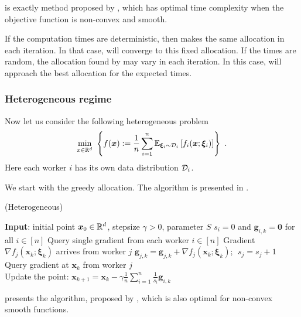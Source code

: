  is exactly  method proposed by \citet{tyurin2024optimal}, which has optimal time complexity when the objective function is non-convex and smooth.

If the computation times are deterministic, then  makes the same allocation in each iteration. In that case,  will converge to this fixed allocation. If the times are random, the allocation found by  may vary in each iteration. In this case,  will approach the best allocation for the expected times.

\subsubsection{Heterogeneous regime}
Now let us consider the following heterogeneous problem
$$
    \min_{x \in \mathbb{R}^d} \ \left\{ f(\bm{x}) := \frac{1}{n} \sum_{i=1}^{n} {\mathbb{E}}_{\bm{\xi}_i \sim \mathcal{D}_i}\left[f_i(\bm{x}; \bm{\xi}_i)\right] \right\}~.
$$
Here each worker $i$ has its own data distribution $\mathcal{D}_i$.

We start with the greedy allocation.
The algorithm is presented in .

\begin{algorithm}[H]
	\caption{ (Heterogeneous)}
    \label{alg:sgd-gta-hetero}
	\begin{algorithmic}[1]
		\STATE \textbf{Input}: initial point $\bm{x}_0 \in \mathbb{R}^d$, stepsize $\gamma > 0$, parameter $S$
        \STATE $s_i=0$ and $\bm{g}_{i,k} = \bm{0}$ for all $i \in [n]$
        \STATE Query single gradient from each worker $i \in [n]$ 
        \STATE Gradient $\nabla f_{j}(\bm{x}_{k}; \bm{\xi}_{k})$ arrives from worker $j$
        \STATE $\bm{g}_{j,k} = \bm{g}_{j,k} + \nabla f_{j}(\bm{x}_{k}; \bm{\xi}_{k})$; $\; s_j = s_j+1$
        \STATE Query gradient at $\bm{x}_{k}$ from worker $j$ \\ 
        \ENDWHILE
        \STATE Update the point: $\bm{x}_{k+1} = \bm{x}_k - \gamma \frac{1}{n} \sum_{i=1}^n \frac{1}{s_i} \bm{g}_{i,k}$
		\ENDFOR
	\end{algorithmic}
\end{algorithm}

 presents the  algorithm, proposed by \citet{tyurin2024optimal}, which is also optimal for non-convex smooth functions.

